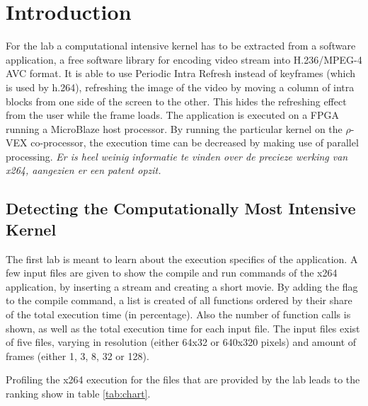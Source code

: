 
\section{Introduction}

For the lab a computational intensive kernel has to be extracted from a  software application, a free software library for encoding video stream into H.236/MPEG-4 AVC format. It is able to use Periodic Intra Refresh instead of keyframes (which is used by h.264), refreshing the image of the video by moving a column of intra blocks from one side of the screen to the other. This hides the refreshing effect from the user while the frame loads. The  application is executed on a FPGA running a MicroBlaze host processor. By running the particular kernel on the $\rho$-VEX co-processor, the execution time can be decreased by making use of parallel processing. 
\emph{Er is heel weinig informatie te vinden over de precieze werking van x264, aangezien er een patent opzit.}

\subsection{Detecting the Computationally Most Intensive Kernel}
The first lab is meant to learn about the execution specifics of the application. A few input files are given to show the compile and run commands of the x264 application, by inserting a  stream and creating a short  movie. By adding the  flag to the compile command, a list is created of all functions ordered by their share of the total execution time (in percentage). Also the number of function calls is shown, as well as the total execution time for each input file. The input files exist of five  files, varying in resolution (either 64x32 or 640x320 pixels) and amount of frames (either 1, 3, 8, 32 or 128).

Profiling the x264 execution for the  files that are provided by the lab leads to the ranking show in table \ref{tab:chart}.

